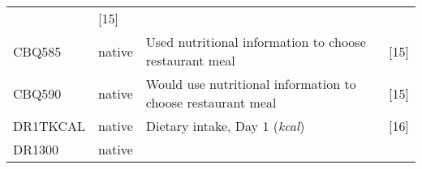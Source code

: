 \documentclass[]{article}
\begin{document}
\begin{longtable}[]{@{}llll@{}}
\begin{minipage}[t]{0.43\columnwidth}
\end{minipage} & \begin{minipage}[t]{0.31\columnwidth}\raggedright
{[}15{]}\strut
\end{minipage}\tabularnewline
\begin{minipage}[t]{0.10\columnwidth}\raggedright
CBQ585\strut
\end{minipage} & \begin{minipage}[t]{0.05\columnwidth}\raggedright
native\strut
\end{minipage} & \begin{minipage}[t]{0.43\columnwidth}\raggedright
Used nutritional information to choose restaurant meal\strut
\end{minipage} & \begin{minipage}[t]{0.31\columnwidth}\raggedright
{[}15{]}\strut
\end{minipage}\tabularnewline
\begin{minipage}[t]{0.10\columnwidth}\raggedright
CBQ590\strut
\end{minipage} & \begin{minipage}[t]{0.05\columnwidth}\raggedright
native\strut
\end{minipage} & \begin{minipage}[t]{0.43\columnwidth}\raggedright
Would use nutritional information to choose restaurant meal\strut
\end{minipage} & \begin{minipage}[t]{0.31\columnwidth}\raggedright
{[}15{]}\strut
\end{minipage}\tabularnewline
\begin{minipage}[t]{0.10\columnwidth}\raggedright
DR1TKCAL\strut
\end{minipage} & \begin{minipage}[t]{0.05\columnwidth}\raggedright
native\strut
\end{minipage} & \begin{minipage}[t]{0.43\columnwidth}\raggedright
Dietary intake, Day 1 (\emph{kcal})\strut
\end{minipage} & \begin{minipage}[t]{0.31\columnwidth}\raggedright
{[}16{]}\strut
\end{minipage}\tabularnewline
\begin{minipage}[t]{0.10\columnwidth}\raggedright
DR1300\strut
\end{minipage} & \begin{minipage}[t]{0.05\columnwidth}\raggedright
native\strut
\end{minipage} & \begin{minipage}[t]{0.43\columnwidth}\raggedright

\end{minipage}
\end{longtable}
\end{document}
